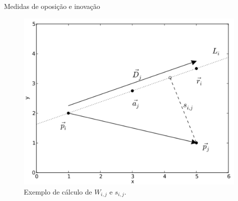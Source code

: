 \documentclass{beamer}
\begin{document}
\begin{frame}{Medidas de oposição e inovação}


\begin{figure}[ht!]
\begin{center}
        \includegraphics[width=.7\textwidth]{figs/desc_opos2.pdf}
              \caption{Exemplo de cálculo de $W_{i,j}$ e $s_{i,j}$.}
        \label{fig:desc_opos_inov}
\end{center}
\end{figure}
\end{frame}
\end{document}

